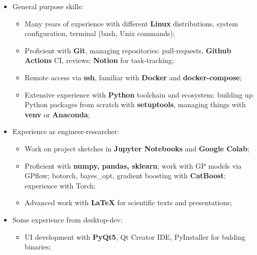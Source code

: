 \documentclass[12pt,a4paper,roman]{moderncv}
\begin{document}
 \begin{itemize}
 \item General purpose skills: \newline
    \begin{itemize}
        \item Many years of experience with different \textbf{Linux} distributions, system configuration, terminal (bash, Unix commands); \newline
        \item Proficient with \textbf{Git}, managing repositories: pull-requests,  \textbf{Github Actions} CI, reviews; \textbf{Notion} for task-tracking; \newline
        \item Remote access via \textbf{ssh}, familiar with \textbf{Docker} and \textbf{docker-compose}; \newline
        \item Extensive experience with \textbf{Python} toolchain and ecosystem: building up Python packages from scratch with \textbf{setuptools},
managing things with \textbf{venv} or \textbf{Anaconda}; \newline
    \end{itemize}    
 \item Experience as engineer-researcher:\newline
    \begin{itemize}
        \item Work on project sketches in \textbf{Jupyter Notebooks} and \textbf{Google Colab}; \newline
        \item Proficient with \textbf{numpy, pandas, sklearn}; work with GP models via GPflow; botorch, bayes\_opt, 
        gradient boosting with \textbf{CatBoost}; experience with Torch; \newline
        \item Advanced work with \textbf{LaTeX} for scientific texts and presentations; \newline
    \end{itemize} 
 \item Some experience from desktop-dev:\newline
    \begin{itemize}
        \item UI development with \textbf{PyQt5}, Qt Creator IDE, PyInstaller for bulding binaries; \newline

\end{itemize}
\end{itemize}
\end{document}
